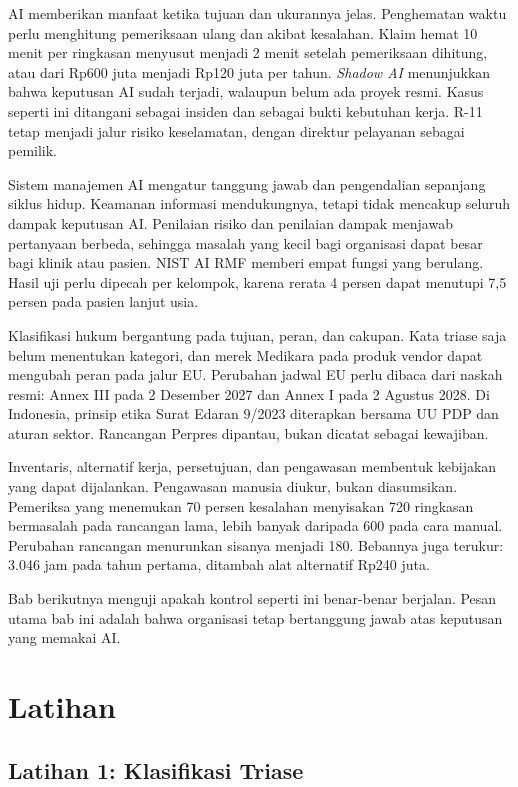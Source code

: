 AI memberikan manfaat ketika tujuan dan ukurannya jelas. Penghematan waktu perlu menghitung
pemeriksaan ulang dan akibat kesalahan. Klaim hemat 10 menit per ringkasan menyusut menjadi 2 menit
setelah pemeriksaan dihitung, atau dari Rp600 juta menjadi Rp120 juta per tahun. \textit{Shadow AI}
menunjukkan bahwa keputusan AI sudah terjadi, walaupun belum ada proyek resmi. Kasus seperti ini
ditangani sebagai insiden dan sebagai bukti kebutuhan kerja. R-11 tetap menjadi jalur risiko
keselamatan, dengan direktur pelayanan sebagai pemilik.

Sistem manajemen AI mengatur tanggung jawab dan pengendalian sepanjang siklus hidup. Keamanan
informasi mendukungnya, tetapi tidak mencakup seluruh dampak keputusan AI. Penilaian risiko dan
penilaian dampak menjawab pertanyaan berbeda, sehingga masalah yang kecil bagi organisasi dapat
besar bagi klinik atau pasien. NIST AI RMF memberi empat fungsi yang berulang. Hasil uji perlu
dipecah per kelompok, karena rerata 4 persen dapat menutupi 7,5 persen pada pasien lanjut usia.

Klasifikasi hukum bergantung pada tujuan, peran, dan cakupan. Kata triase saja belum menentukan
kategori, dan merek Medikara pada produk vendor dapat mengubah peran pada jalur EU. Perubahan
jadwal EU perlu dibaca dari naskah resmi: Annex III pada 2 Desember 2027 dan Annex I pada 2 Agustus
2028. Di Indonesia, prinsip etika Surat Edaran 9/2023 diterapkan bersama UU PDP dan aturan sektor.
Rancangan Perpres dipantau, bukan dicatat sebagai kewajiban.

Inventaris, alternatif kerja, persetujuan, dan pengawasan membentuk kebijakan yang dapat dijalankan.
Pengawasan manusia diukur, bukan diasumsikan. Pemeriksa yang menemukan 70 persen kesalahan
menyisakan 720 ringkasan bermasalah pada rancangan lama, lebih banyak daripada 600 pada cara manual.
Perubahan rancangan menurunkan sisanya menjadi 180. Bebannya juga terukur: 3.046 jam pada tahun
pertama, ditambah alat alternatif Rp240 juta.

Bab berikutnya menguji apakah kontrol seperti ini benar-benar berjalan. Pesan utama bab ini adalah
bahwa organisasi tetap bertanggung jawab atas keputusan yang memakai AI.

\section{Latihan}

\subsection*{Latihan 1: Klasifikasi Triase}

